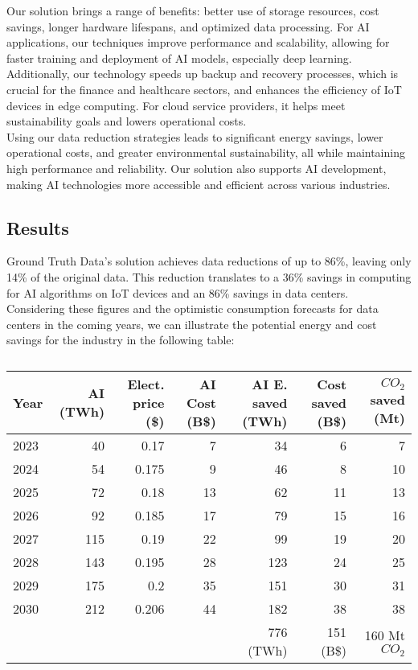 Our solution brings a range of benefits: better use of storage resources, cost savings, longer hardware lifespans, and optimized data processing. For AI applications, our techniques improve performance and scalability, allowing for faster training and deployment of AI models, especially deep learning.\\

Additionally, our technology speeds up backup and recovery processes, which is crucial for the finance and healthcare sectors, and enhances the efficiency of IoT devices in edge computing. For cloud service providers, it helps meet sustainability goals and lowers operational costs.\\

Using our data reduction strategies leads to significant energy savings, lower operational costs, and greater environmental sustainability, all while maintaining high performance and reliability. Our solution also supports AI development, making AI technologies more accessible and efficient across various industries.

\subsection{Results}

Ground Truth Data's solution achieves data reductions of up to 86\%, leaving only 14\% of the original data. This reduction translates to a 36\% savings in computing for AI algorithms on IoT devices and an 86\% savings in data centers.\\


Considering these figures and the optimistic consumption forecasts for data centers in the coming years, we can illustrate the potential energy and cost savings for the industry in the following table:

\begin{table}[H]
    \centering
    \footnotesize
    \begin{tabular}{|lrrrrrr}
        \toprule
        Year & AI (TWh) & Elect. price (\$) & AI Cost (B\$) & AI E. saved (TWh) & Cost saved (B\$)  & $CO_2$ saved (Mt)  \\
        \midrule
        2023 & 40  & 0.17  & 7  & 34  & 6  & 7  \\
        2024 & 54  & 0.175 & 9  & 46  & 8  & 10 \\
        2025 & 72  & 0.18  & 13 & 62  & 11 & 13 \\
        2026 & 92  & 0.185 & 17 & 79  & 15 & 16 \\
        2027 & 115 & 0.19  & 22 & 99  & 19 & 20 \\
        2028 & 143 & 0.195 & 28 & 123 & 24 & 25 \\
        2029 & 175 & 0.2   & 35 & 151 & 30 & 31 \\
        2030 & 212 & 0.206 & 44 & 182 & 38 & 38 \\
        \midrule
        & & & & 776 (TWh) & 151 (B\$) & 160 Mt $CO_2$ \\
        \bottomrule
    \end{tabular}
    \caption{}
    \label{tab:ai_summary}
\end{table}
